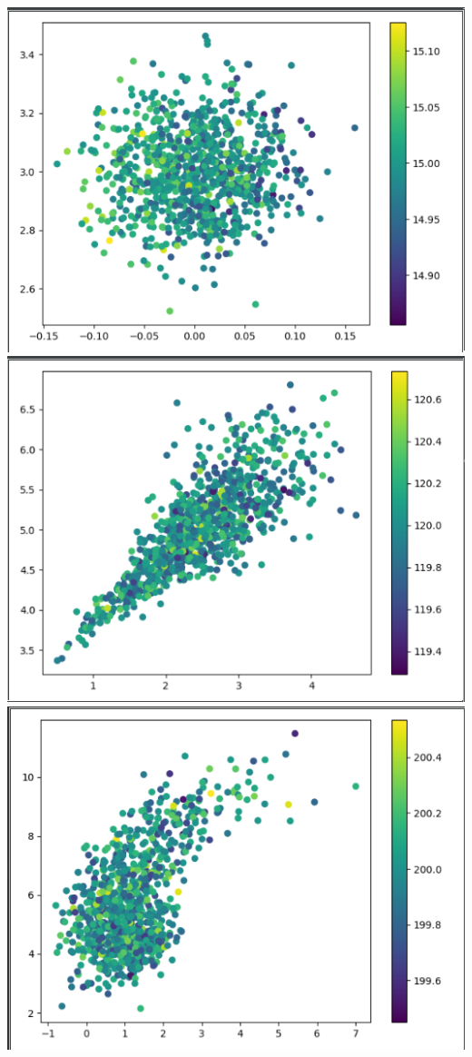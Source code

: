 \documentclass{article}
\begin{document}
		\begin{center}
		\includegraphics[scale=0.4]{step4}
		\includegraphics[scale=0.4]{step5}
		\includegraphics[scale=0.4]{step6}
		
	\end{center}
\end{document}
